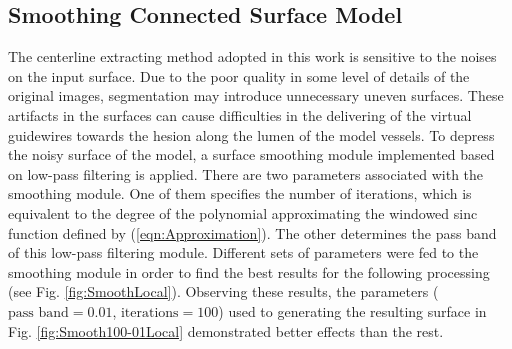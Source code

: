 
\subsection{Smoothing Connected Surface Model}

The centerline extracting method adopted in this work is sensitive to the noises on the input surface.
Due to the poor quality in some level of details of the original images, segmentation may introduce unnecessary uneven surfaces.
These artifacts in the surfaces can cause difficulties in the delivering of the virtual guidewires towards the hesion along the lumen of the model vessels.
To depress the noisy surface of the model, a surface smoothing module implemented based on low-pass filtering is applied.
There are two parameters associated with the smoothing module.
One of them specifies the number of iterations, which is equivalent to the degree of the polynomial approximating the windowed sinc function defined by (\ref{eqn:Approximation}).
The other determines the pass band of this low-pass filtering module.
Different sets of parameters were fed to the smoothing module in order to find the best results for the following processing (see Fig. \ref{fig:SmoothLocal}).
Observing these results, the parameters ($\text{pass band} = 0.01$, $\text{iterations} = 100$) used to generating the resulting surface in Fig. \ref{fig:Smooth100-01Local} demonstrated better effects than the rest.

